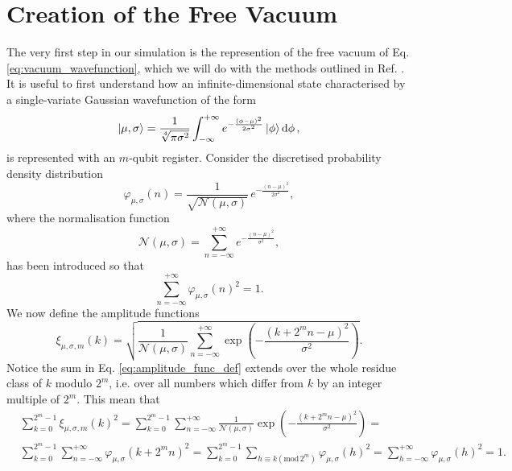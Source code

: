 \documentclass[a4paper,10pt]{report}
\begin{document}
\section{Creation of the Free Vacuum}
The very first step in our simulation is the represention of the free vacuum of Eq. \eqref{eq:vacuum_wavefunction}, which we will do with the methods outlined in Ref. \cite{kitaev08}. It is useful to first understand how an infinite-dimensional state characterised by a single-variate Gaussian wavefunction of the form
\begin{equation}
\ket{\mu,\sigma} = \frac{1}{\sqrt[4]{\pi\sigma^2}}\int_{-\infty}^{+\infty} e^{-\frac{(\phi-\mu)^2}{2\sigma^2}}\ket{\phi}\dd{\phi},
\label{eq:1-dim_gaussian}
\end{equation}
is represented with an $m$-qubit register. Consider the discretised probability density distribution
\begin{equation}
\varphi_{\mu,\sigma}(n) = \frac{1}{\sqrt{\mathcal{N}(\mu,\sigma)}}\,e^{-\frac{(n-\mu)^2}{2\sigma^2}},
\end{equation}
where the normalisation function
\begin{equation}
\mathcal{N}(\mu,\sigma) = \sum_{n=-\infty}^{+\infty}e^{-\frac{(n-\mu)^2}{\sigma^2}},
\label{eq:gaussian_norm_func}
\end{equation}
has been introduced so that
\begin{equation}
\sum_{n=-\infty}^{+\infty}\varphi_{\mu,\sigma}(n)^2 = 1.
\end{equation}
We now define the amplitude functions
\begin{equation}
\xi_{\mu,\sigma,m}(k) = \sqrt{\frac{1}{\mathcal{N}(\mu,\sigma)}\sum_{n=-\infty}^{+\infty}\exp(-\frac{(k+2^mn-\mu)^2}{\sigma^2})}.
\label{eq:amplitude_func_def}
\end{equation}
Notice the sum in Eq. \eqref{eq:amplitude_func_def} extends over the whole residue class of $k$ modulo $2^m$, i.e. over all numbers which differ from $k$ by an integer multiple of $2^m$. This mean that
\begin{align}
&\sum_{k=0}^{2^m-1}\xi_{\mu,\sigma,m}(k)^2 = \sum_{k=0}^{2^m-1}\sum_{n=-\infty}^{+\infty}\frac{1}{\mathcal{N}(\mu,\sigma)}\exp(-\frac{(k+2^mn-\mu)^2}{\sigma^2}) = \nonumber\\
&\sum_{k=0}^{2^m-1}\sum_{n=-\infty}^{+\infty}\varphi_{\mu,\sigma}(k+2^mn)^2 = \sum_{k=0}^{2^m-1}\sum_{h\equiv k(\mathrm{mod}\,2^m)}\varphi_{\mu,\sigma}(h)^2 = \sum_{h=-\infty}^{+\infty}\varphi_{\mu,\sigma}(h)^2  = 1.
\end{align}
\end{document}

